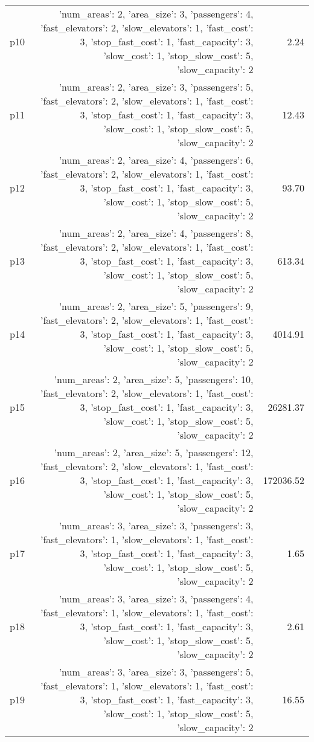 \documentclass{article}
\begin{document}
\begin{center}
\begin{tabular}{@{}l|r|r@{}}
  p10&{'num\_areas': 2, 'area\_size': 3, 'passengers': 4, 'fast\_elevators': 2, 'slow\_elevators': 1, 'fast\_cost': 3, 'stop\_fast\_cost': 1, 'fast\_capacity': 3, 'slow\_cost': 1, 'stop\_slow\_cost': 5, 'slow\_capacity': 2}&2.24\\
  p11&{'num\_areas': 2, 'area\_size': 3, 'passengers': 5, 'fast\_elevators': 2, 'slow\_elevators': 1, 'fast\_cost': 3, 'stop\_fast\_cost': 1, 'fast\_capacity': 3, 'slow\_cost': 1, 'stop\_slow\_cost': 5, 'slow\_capacity': 2}&12.43\\
  p12&{'num\_areas': 2, 'area\_size': 4, 'passengers': 6, 'fast\_elevators': 2, 'slow\_elevators': 1, 'fast\_cost': 3, 'stop\_fast\_cost': 1, 'fast\_capacity': 3, 'slow\_cost': 1, 'stop\_slow\_cost': 5, 'slow\_capacity': 2}&93.70\\
  p13&{'num\_areas': 2, 'area\_size': 4, 'passengers': 8, 'fast\_elevators': 2, 'slow\_elevators': 1, 'fast\_cost': 3, 'stop\_fast\_cost': 1, 'fast\_capacity': 3, 'slow\_cost': 1, 'stop\_slow\_cost': 5, 'slow\_capacity': 2}&613.34\\
  p14&{'num\_areas': 2, 'area\_size': 5, 'passengers': 9, 'fast\_elevators': 2, 'slow\_elevators': 1, 'fast\_cost': 3, 'stop\_fast\_cost': 1, 'fast\_capacity': 3, 'slow\_cost': 1, 'stop\_slow\_cost': 5, 'slow\_capacity': 2}&4014.91\\
  p15&{'num\_areas': 2, 'area\_size': 5, 'passengers': 10, 'fast\_elevators': 2, 'slow\_elevators': 1, 'fast\_cost': 3, 'stop\_fast\_cost': 1, 'fast\_capacity': 3, 'slow\_cost': 1, 'stop\_slow\_cost': 5, 'slow\_capacity': 2}&26281.37\\
  p16&{'num\_areas': 2, 'area\_size': 5, 'passengers': 12, 'fast\_elevators': 2, 'slow\_elevators': 1, 'fast\_cost': 3, 'stop\_fast\_cost': 1, 'fast\_capacity': 3, 'slow\_cost': 1, 'stop\_slow\_cost': 5, 'slow\_capacity': 2}&172036.52\\
  p17&{'num\_areas': 3, 'area\_size': 3, 'passengers': 3, 'fast\_elevators': 1, 'slow\_elevators': 1, 'fast\_cost': 3, 'stop\_fast\_cost': 1, 'fast\_capacity': 3, 'slow\_cost': 1, 'stop\_slow\_cost': 5, 'slow\_capacity': 2}&1.65\\
  p18&{'num\_areas': 3, 'area\_size': 3, 'passengers': 4, 'fast\_elevators': 1, 'slow\_elevators': 1, 'fast\_cost': 3, 'stop\_fast\_cost': 1, 'fast\_capacity': 3, 'slow\_cost': 1, 'stop\_slow\_cost': 5, 'slow\_capacity': 2}&2.61\\
  p19&{'num\_areas': 3, 'area\_size': 3, 'passengers': 5, 'fast\_elevators': 1, 'slow\_elevators': 1, 'fast\_cost': 3, 'stop\_fast\_cost': 1, 'fast\_capacity': 3, 'slow\_cost': 1, 'stop\_slow\_cost': 5, 'slow\_capacity': 2}&16.55\\

\end{tabular}
\end{center}
\end{document}
